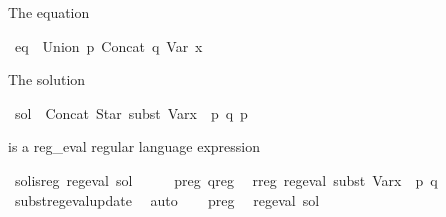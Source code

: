 \begin{isabellebody}
%
\begin{isamarkuptext}%
The equation%
\end{isamarkuptext}\isamarkuptrue%
\isamarkupfalse%
\ {\isachardoublequoteopen}eq\ {\isasymequiv}\ Union\ p\ {\isacharparenleft}{\kern0pt}Concat\ q\ {\isacharparenleft}{\kern0pt}Var\ x{\isacharparenright}{\kern0pt}{\isacharparenright}{\kern0pt}{\isachardoublequoteclose}%
\begin{isamarkuptext}%
The solution%
\end{isamarkuptext}\isamarkuptrue%
\isamarkupfalse%
\ {\isachardoublequoteopen}sol\ {\isasymequiv}\ Concat\ {\isacharparenleft}{\kern0pt}Star\ {\isacharparenleft}{\kern0pt}subst\ {\isacharparenleft}{\kern0pt}Var{\isacharparenleft}{\kern0pt}x\ {\isacharcolon}{\kern0pt}{\isacharequal}{\kern0pt}\ p{\isacharparenright}{\kern0pt}{\isacharparenright}{\kern0pt}\ q{\isacharparenright}{\kern0pt}{\isacharparenright}{\kern0pt}\ p{\isachardoublequoteclose}%
\begin{isamarkuptext}%
 is a reg_eval regular language expression%
\end{isamarkuptext}\isamarkuptrue%
\isamarkupfalse%
\ sol{\isacharunderscore}{\kern0pt}is{\isacharunderscore}{\kern0pt}reg{\isacharcolon}{\kern0pt}\ {\isachardoublequoteopen}reg{\isacharunderscore}{\kern0pt}eval\ sol{\isachardoublequoteclose}\isanewline
%
\isadelimproof
%
\endisadelimproof
%
\isatagproof
{}\isamarkupfalse%
\ {\isacharminus}{\kern0pt}\isanewline
\ \ \isamarkupfalse%
\ p{\isacharunderscore}{\kern0pt}reg\ q{\isacharunderscore}{\kern0pt}reg\ \isamarkupfalse%
\ r{\isacharunderscore}{\kern0pt}reg{\isacharcolon}{\kern0pt}\ {\isachardoublequoteopen}reg{\isacharunderscore}{\kern0pt}eval\ {\isacharparenleft}{\kern0pt}subst\ {\isacharparenleft}{\kern0pt}Var{\isacharparenleft}{\kern0pt}x\ {\isacharcolon}{\kern0pt}{\isacharequal}{\kern0pt}\ p{\isacharparenright}{\kern0pt}{\isacharparenright}{\kern0pt}\ q{\isacharparenright}{\kern0pt}{\isachardoublequoteclose}\isanewline
\ \ \ \ \isamarkupfalse%
\ subst{\isacharunderscore}{\kern0pt}reg{\isacharunderscore}{\kern0pt}eval{\isacharunderscore}{\kern0pt}update\ \isamarkupfalse%
\ auto\isanewline
\ \ \isamarkupfalse%
\ p{\isacharunderscore}{\kern0pt}reg\ \isamarkupfalse%
\ {\isachardoublequoteopen}reg{\isacharunderscore}{\kern0pt}eval\ sol{\isachardoublequoteclose}\ \isamarkupfalse%

\end{isabellebody}

